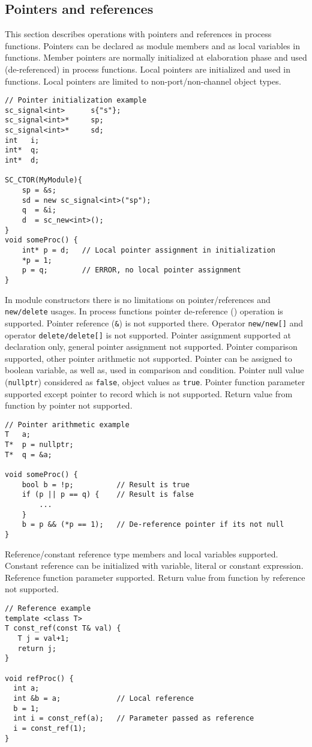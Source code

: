 \subsection{Pointers and references}

This section describes operations with pointers and references in process functions. 
Pointers can be declared as module members and as local variables in functions. Member pointers are normally initialized at elaboration phase and used (de-referenced) in process functions. Local pointers are initialized and used in functions. Local pointers are limited to non-port/non-channel object types. 

\begin{lstlisting}[style=mycpp]
// Pointer initialization example
sc_signal<int>      s{"s"};
sc_signal<int>*     sp;
sc_signal<int>*     sd;
int   i;
int*  q;
int*  d;

SC_CTOR(MyModule){
    sp = &s;
    sd = new sc_signal<int>("sp");   
    q  = &i;
    d  = sc_new<int>();
}
void someProc() {
    int* p = d;   // Local pointer assignment in initialization
    *p = 1;
    p = q;        // ERROR, no local pointer assignment   
}
\end{lstlisting}

In module constructors there is no limitations on pointer/references and {\tt new/delete} usages. In process functions pointer de-reference ({\tt *}) operation is supported. Pointer reference ({\tt \&}) is not supported there. Operator {\tt new/new[]} and operator {\tt delete/delete[]} is not supported. Pointer assignment supported at declaration only, general pointer assignment not supported. Pointer comparison supported, other pointer arithmetic not supported. Pointer can be assigned to boolean variable, as well as, used in comparison and condition. Pointer null value ({\tt nullptr}) considered as {\tt false}, object values as {\tt true}.
Pointer function parameter supported except pointer to record which is not supported. Return value from function by pointer not supported.

\begin{lstlisting}[style=mycpp]
// Pointer arithmetic example
T   a;
T*  p = nullptr;
T*  q = &a;

void someProc() {
    bool b = !p;          // Result is true
    if (p || p == q) {    // Result is false
        ...
    }
    b = p && (*p == 1);   // De-reference pointer if its not null
}
\end{lstlisting}

Reference/constant reference type members and local variables supported. Constant reference can be initialized with variable, literal or constant expression. Reference function parameter supported. Return value from function by reference not supported. 
%
\begin{lstlisting}[style=mycpp]
// Reference example
template <class T>
T const_ref(const T& val) {
   T j = val+1;
   return j;
}

void refProc() {
  int a;
  int &b = a;             // Local reference
  b = 1;
  int i = const_ref(a);   // Parameter passed as reference
  i = const_ref(1);
}
\end{lstlisting}


